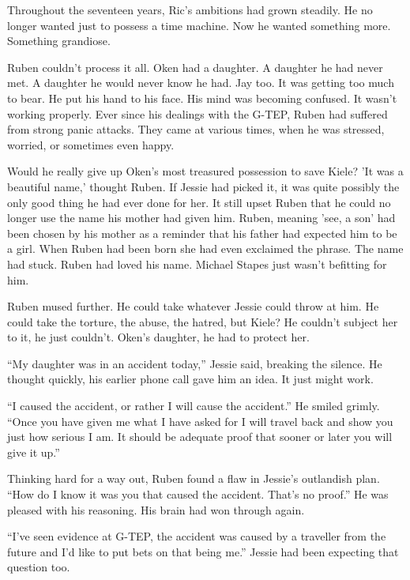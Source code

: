 Throughout the seventeen years, Ric's ambitions had grown steadily.  He no longer wanted just to possess a time machine.  Now he wanted something more.  Something grandiose. 



\thoughtbreak



Ruben couldn't process it all.  Oken had a daughter.  A daughter he had never met.  A daughter he would never know he had.  Jay too.  It was getting too much to bear.  He put his hand to his face.  His mind was becoming confused.  It wasn't working properly.  Ever since his dealings with the G-TEP, Ruben had suffered from strong panic attacks.  They came at various times, when he was stressed, worried, or sometimes even happy.

Would he really give up Oken's most treasured possession to save Kiele?  'It was a beautiful name,' thought Ruben.  If Jessie had picked it, it was quite possibly the only good thing he had ever done for her.  It still upset Ruben that he could no longer use the name his mother had given him.  Ruben, meaning 'see, a son' had been chosen by his mother as a reminder that his father had expected him to be a girl.  When Ruben had been born she had even exclaimed the phrase.  The name had stuck.  Ruben had loved his name.  Michael Stapes just wasn't befitting for him.

Ruben mused further.  He could take whatever Jessie could throw at him.  He could take the torture, the abuse, the hatred, but Kiele?  He couldn't subject her to it, he just couldn't.  Oken's daughter, he had to protect her.

``My daughter was in an accident today,'' Jessie said, breaking the silence.  He thought quickly, his earlier phone call gave him an idea.  It just might work.  

``I caused the accident, or rather I will cause the accident.''  He smiled grimly.  ``Once you have given me what I have asked for I will travel back and show you just how serious I am.  It should be adequate proof that sooner or later you will give it up.'' 

Thinking hard for a way out, Ruben found a flaw in Jessie's outlandish plan. ``How do I know it was you that caused the accident.  That's no proof.''  He was pleased with his reasoning.  His brain had won through again.  

``I've seen evidence at G-TEP, the accident was caused by a traveller from the future and I'd like to put bets on that being me.''  Jessie had been expecting that question too.

